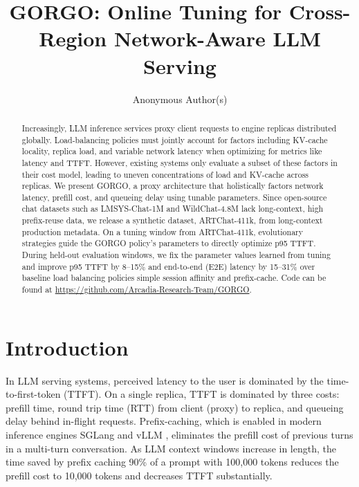 \documentclass{article}
\title{GORGO: Online Tuning for Cross-Region Network-Aware LLM Serving}
\author{Anonymous Author(s)}
\begin{document}
\maketitle

\begin{abstract}
Increasingly, LLM inference services proxy client requests to engine replicas distributed globally.
Load-balancing policies must jointly account for
factors including KV-cache locality, replica load, and variable network latency when
optimizing for metrics like latency and TTFT.
However, existing systems only evaluate a subset of these factors in their cost
model, leading to uneven concentrations of load and KV-cache across replicas. We
present GORGO, a proxy architecture that holistically factors network latency,
prefill cost, and queueing delay using tunable parameters. Since open-source chat
datasets such as LMSYS-Chat-1M and WildChat-4.8M lack long-context, high
prefix-reuse data, we release a synthetic dataset, ARTChat-411k, from
long-context production metadata. On a tuning window from ARTChat-411k,
evolutionary strategies guide the GORGO policy's parameters to directly optimize
p95 TTFT. During held-out evaluation windows, we fix the parameter values learned
from tuning and improve p95 TTFT by 8--15\% and end-to-end (E2E) latency by
15--31\% over baseline load balancing policies simple session affinity and prefix-cache.
Code can be found at \href{https://github.com/Arcadia-Research-Team/GORGO}{https://github.com/Arcadia-Research-Team/GORGO}.
\end{abstract}

\section{Introduction}
\label{sec:intro}

In LLM serving systems, perceived latency to the user is dominated by the time-to-first-token (TTFT). On a single replica, TTFT is dominated by three costs: prefill time, round trip time (RTT) from client (proxy) to replica, and queueing delay behind in-flight requests. Prefix-caching, which is enabled in modern inference engines SGLang \citep{sglang2024} and vLLM \citep{vllm2023}, eliminates the prefill cost of previous turns in a multi-turn conversation. As LLM context windows increase in length, the time saved by prefix caching 90\% of a prompt with 100,000 tokens reduces the prefill cost to 10,000 tokens and decreases TTFT substantially.
\end{document}
